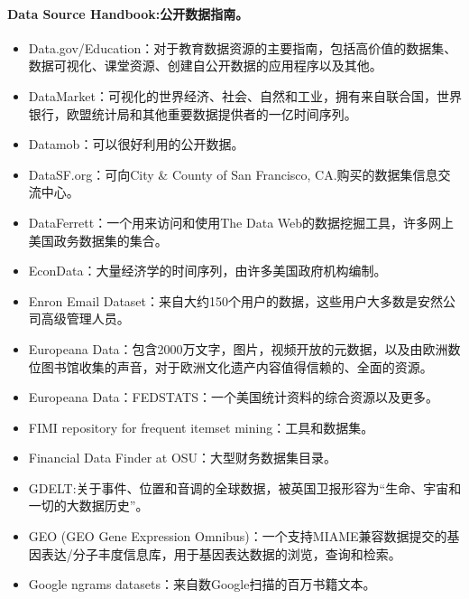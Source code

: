 \documentclass[letterpaper,10pt,english]{sphinxmanual}
\begin{document}
\paragraph{Data Source Handbook:公开数据指南。}
\label{opendatasource:data-source-handbook}\begin{itemize}
\item {} 
Data.gov/Education：对于教育数据资源的主要指南，包括高价值的数据集、数据可视化、课堂资源、创建自公开数据的应用程序以及其他。

\item {} 
DataMarket：可视化的世界经济、社会、自然和工业，拥有来自联合国，世界银行，欧盟统计局和其他重要数据提供者的一亿时间序列。

\item {} 
Datamob：可以很好利用的公开数据。

\item {} 
DataSF.org：可向City \& County of San Francisco, CA.购买的数据集信息交流中心。

\item {} 
DataFerrett：一个用来访问和使用The Data Web的数据挖掘工具，许多网上美国政务数据集的集合。

\item {} 
EconData：大量经济学的时间序列，由许多美国政府机构编制。

\item {} 
Enron Email Dataset：来自大约150个用户的数据，这些用户大多数是安然公司高级管理人员。

\item {} 
Europeana Data：包含2000万文字，图片，视频开放的元数据，以及由欧洲数位图书馆收集的声音，对于欧洲文化遗产内容值得信赖的、全面的资源。

\item {} 
Europeana Data：FEDSTATS：一个美国统计资料的综合资源以及更多。

\item {} 
FIMI repository for frequent itemset mining：工具和数据集。

\item {} 
Financial Data Finder at OSU：大型财务数据集目录。

\item {} 
GDELT:关于事件、位置和音调的全球数据，被英国卫报形容为“生命、宇宙和一切的大数据历史”。

\item {} 
GEO (GEO Gene Expression Omnibus)：一个支持MIAME兼容数据提交的基因表达/分子丰度信息库，用于基因表达数据的浏览，查询和检索。

\item {} 
Google ngrams datasets：来自数Google扫描的百万书籍文本。


\end{itemize}
\end{document}
